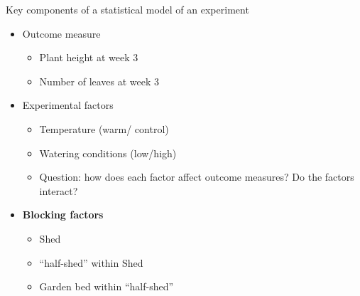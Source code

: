 \documentclass{beamer}
\begin{document}
\begin{frame}{Key components of a statistical model of an experiment}
 \begin{itemize}
  \item Outcome measure
  \begin{itemize}
   \item Plant height at week 3
    \item Number of leaves at week 3
  \end{itemize}
  \item Experimental factors 
  \begin{itemize}
   \item Temperature (warm/ control)
    \item Watering conditions (low/high) 
    \item Question: how does each factor affect outcome measures? Do the factors interact?
  \end{itemize}
  \item \textbf{Blocking factors}
  \begin{itemize}
   \item Shed
    \item “half-shed” within Shed
    \item Garden bed within “half-shed”
  \end{itemize}
\end{itemize}
\end{frame}
\end{document}
